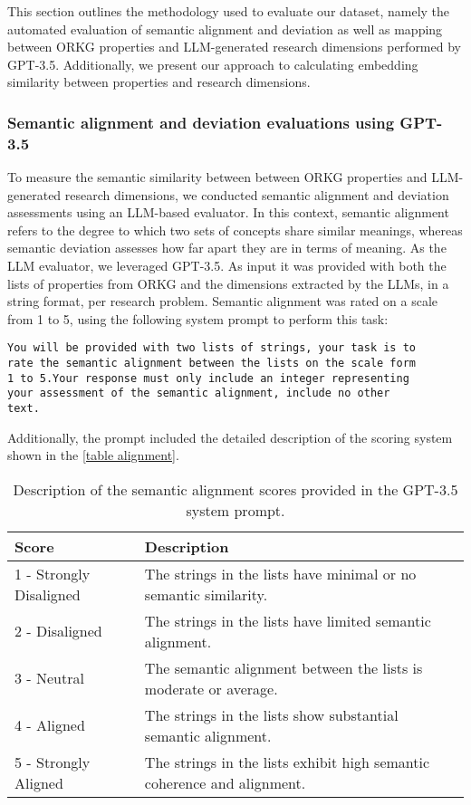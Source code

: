 This section outlines the methodology used to evaluate our dataset, namely the automated evaluation of semantic alignment and deviation as well as mapping between ORKG properties and LLM-generated research dimensions performed by GPT-3.5. Additionally, we present our approach to calculating embedding similarity between properties and research dimensions.

\subsubsection{Semantic alignment and deviation evaluations using GPT-3.5}

To measure the semantic similarity between between ORKG properties and LLM-generated research dimensions, we conducted semantic alignment and deviation assessments using an LLM-based evaluator. In this context, semantic alignment refers to the degree to which two sets of concepts share similar meanings, whereas semantic deviation assesses how far apart they are in terms of meaning. As the LLM evaluator, we leveraged GPT-3.5. As input it was provided with both the lists of properties from ORKG and the dimensions extracted by the LLMs, in a string format, per research problem. Semantic alignment was rated on a scale from 1 to 5, using the following system prompt to perform this task:

\begin{verbatim}
You will be provided with two lists of strings, your task is to
rate the semantic alignment between the lists on the scale form
1 to 5.Your response must only include an integer representing 
your assessment of the semantic alignment, include no other 
text.
\end{verbatim}

Additionally, the prompt included the detailed description of the scoring system shown in the \autoref{table alignment}.

\begin{table}[!htb] 
\caption{Description of the semantic alignment scores provided in the GPT-3.5 system prompt.\label{table alignment}}
\begin{tabular}{|l|p{9cm}|}
\hline
\textbf{Score}	& \textbf{Description}\\
\hline
1 - Strongly Disaligned &
The strings in the lists have minimal or no semantic similarity. \\
2 - Disaligned &
The strings in the lists have limited semantic alignment. \\
3 - Neutral &
The semantic alignment between the lists is moderate or average. \\
4 - Aligned &
The strings in the lists show substantial semantic alignment. \\
5 - Strongly Aligned &
The strings in the lists exhibit high semantic coherence and alignment. \\
\hline
\end{tabular}
\end{table}

